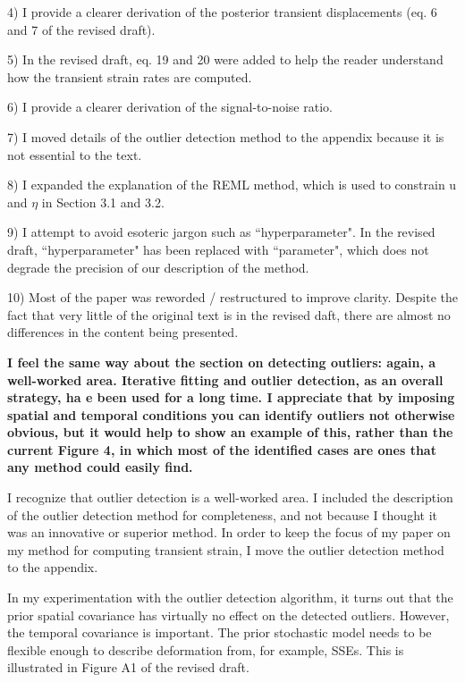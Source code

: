 \documentclass[10pt,a4paper]{letter}
\begin{document}
\begin{letter}{}
  4) I provide a clearer derivation of the posterior transient
     displacements (eq. 6 and 7 of the revised draft). 
  
  5) In the revised draft, eq. 19 and 20 were added to help the reader
     understand how the transient strain rates are computed.

  6) I provide a clearer derivation of the signal-to-noise ratio.
  
  7) I moved details of the outlier detection method to the appendix
     because it is not essential to the text.

  8) I expanded the explanation of the REML method, which is used to
     constrain u and $\eta$ in Section 3.1 and 3.2.

  9) I attempt to avoid esoteric jargon such as ``hyperparameter". In
     the revised draft, ``hyperparameter" has been replaced with
     ``parameter", which does not degrade the precision of our
     description of the method.
  
  10) Most of the paper was reworded / restructured to improve
     clarity. Despite the fact that very little of the original text
     is in the revised daft, there are almost no differences in the
     content being presented.
 

\textbf{I feel the same way about the section on detecting outliers: again, a
well-worked area. Iterative fitting and outlier detection, as an
overall strategy, ha e been used for a long time. I appreciate that
by imposing spatial and temporal conditions you can identify outliers
not otherwise obvious, but it would help to show an example of this,
rather than the current Figure 4, in which most of the identified
cases are ones that any method could easily find.}

I recognize that outlier detection is a well-worked area. I included
the description of the outlier detection method for completeness, and
not because I thought it was an innovative or superior method. In
order to keep the focus of my paper on my method for computing
transient strain, I move the outlier detection method to the appendix.

In my experimentation with the outlier detection algorithm, it turns
out that the prior spatial covariance has virtually no effect on the
detected outliers. However, the temporal covariance is important. The
prior stochastic model needs to be flexible enough to describe
deformation from, for example, SSEs. This is illustrated in Figure A1
of the revised draft.


\end{letter}
\end{document}
